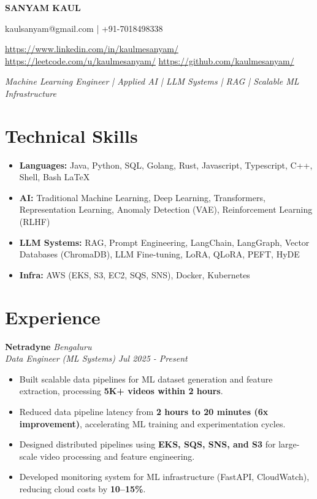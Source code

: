 \documentclass[10pt,a4paper]{article}
\newcommand{\resumeItem}[1]{\item\small{#1}}
\begin{document}
\begin{center}
    {\Huge\bfseries SANYAM KAUL} \\ \vspace{2pt}
    
    \small kaulsanyam@gmail.com \quad | \quad +91-7018498338 \\ \vspace{2pt}
    
    \small
    \href{https://www.linkedin.com/in/kaulmesanyam/}{https://www.linkedin.com/in/kaulmesanyam/} \quad
    \href{https://leetcode.com/u/kaulmesanyam/}{https://leetcode.com/u/kaulmesanyam/} \quad
    \href{https://github.com/kaulmesanyam/}{https://github.com/kaulmesanyam/} \\ \vspace{2pt}
    
    \textit{Machine Learning Engineer | Applied AI | LLM Systems | RAG | Scalable ML Infrastructure}
\end{center}

\vspace{4pt}

\section{Technical Skills}
\begin{itemize}[leftmargin=*,noitemsep]
    \resumeItem{\textbf{Languages:} Java, Python, SQL, Golang, Rust, Javascript, Typescript, C++, Shell, Bash LaTeX}
    \resumeItem{\textbf{AI:} Traditional Machine Learning, Deep Learning, Transformers, Representation Learning, Anomaly Detection (VAE), Reinforcement Learning (RLHF)}
    \resumeItem{\textbf{LLM Systems:} RAG, Prompt Engineering, LangChain, LangGraph, Vector Databases (ChromaDB), LLM Fine-tuning, LoRA, QLoRA, PEFT, HyDE}
    \resumeItem{\textbf{Infra:} AWS (EKS, S3, EC2, SQS, SNS), Docker, Kubernetes}
\end{itemize}

\vspace{4pt}

\section{Experience}

\textbf{Netradyne} \hfill \textit{Bengaluru} \\
\textit{Data Engineer (ML Systems)} \hfill \textit{Jul 2025 - Present}
\begin{itemize}[leftmargin=*,noitemsep]
    \resumeItem{Built scalable data pipelines for ML dataset generation and feature extraction, processing \textbf{5K+ videos within 2 hours}.}
    \resumeItem{Reduced data pipeline latency from \textbf{2 hours to 20 minutes (6x improvement)}, accelerating ML training and experimentation cycles.}
    \resumeItem{Designed distributed pipelines using \textbf{EKS, SQS, SNS, and S3} for large-scale video processing and feature engineering.}
    \resumeItem{Developed monitoring system for ML infrastructure (FastAPI, CloudWatch), reducing cloud costs by \textbf{10--15\%}.}
\end{itemize}
\end{document}
